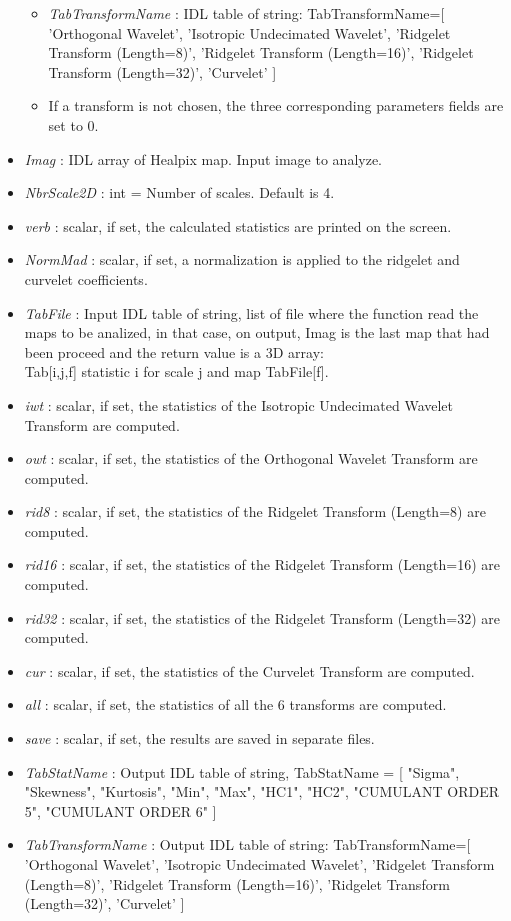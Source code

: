 \begin{itemize}
\begin{itemize}
\item {\em TabTransformName} : IDL table of string: TabTransformName=[ 'Orthogonal Wavelet', 'Isotropic Undecimated Wavelet', 'Ridgelet Transform (Length=8)', 
'Ridgelet Transform (Length=16)', 'Ridgelet Transform (Length=32)', 'Curvelet' ]
\item If a transform is not chosen, the three corresponding parameters fields are set to 0.
\end{itemize}
\item {\em Imag} : IDL array of Healpix map. Input image to analyze. 
\item {\em NbrScale2D} : int = Number of scales. Default is 4.  
\item {\em verb} : scalar, if set, the calculated statistics are printed on the screen.
\item {\em NormMad} : scalar, if set, a normalization is applied to the ridgelet and curvelet coefficients.
\item {\em TabFile} : Input IDL table of string, list of file where the function read the maps to be analized, in that case, on output, 
Imag is the last map that had been proceed and the return value is a 3D array:\\
Tab[i,j,f] \qquad statistic i for scale j and map TabFile[f].
\item {\em iwt} : scalar, if set, the statistics of the Isotropic Undecimated Wavelet Transform are computed.
\item {\em owt} : scalar, if set, the statistics of the Orthogonal Wavelet Transform are computed.
\item {\em rid8} : scalar, if set, the statistics of the Ridgelet Transform (Length=8) are computed.
\item {\em rid16} : scalar, if set, the statistics of the Ridgelet Transform (Length=16) are computed.
\item {\em rid32} : scalar, if set, the statistics of the Ridgelet Transform (Length=32) are computed.
\item {\em cur} : scalar, if set, the statistics of the Curvelet Transform are computed.
\item {\em all} : scalar, if set, the statistics of all the 6 transforms are computed.
\item {\em save} : scalar, if set, the results are saved in separate files.
\item {\em TabStatName} : Output IDL table of string, TabStatName = [ "Sigma", "Skewness", "Kurtosis", "Min", "Max", "HC1", "HC2", "CUMULANT ORDER 5", "CUMULANT ORDER 6" ]
\item {\em TabTransformName} : Output IDL table of string: 
TabTransformName=[ 'Orthogonal Wavelet', 'Isotropic Undecimated Wavelet', 'Ridgelet Transform (Length=8)', 'Ridgelet Transform (Length=16)', 'Ridgelet Transform (Length=32)', 'Curvelet' ]
\end{itemize}

